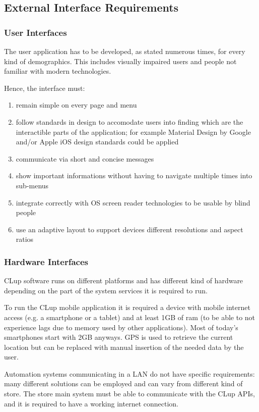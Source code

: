 \subsection{External Interface Requirements}
\subsubsection{User Interfaces}
The user application has to be developed, as stated numerous times, for every kind of demographics.
This includes visually impaired users and people not familiar with modern technologies.

Hence, the interface must:
\begin{enumerate}
    \item remain simple on every page and menu
    \item follow standards in design to accomodate users into finding which are the interactible parts of the application; for example Material Design by Google and/or Apple iOS design standards could be applied
    \item communicate via short and concise messages
    \item show important informations without having to navigate multiple times into sub-menus
    \item integrate correctly with OS screen reader technologies to be usable by blind people
    \item use an adaptive layout to support devices different resolutions and aspect ratios
\end{enumerate}

\subsubsection{Hardware Interfaces}
CLup software runs on different platforms and has different kind of hardware depending on the part of the system services it is required to run.

To run the CLup mobile application it is required a device with mobile internet access (e.g. a smartphone or a tablet) and at least 1GB of ram (to be able to not experience lags due to memory used by other applications). Most of today's smartphones start with 2GB anyways.
GPS is used to retrieve the current location but can be replaced with manual insertion of the needed data by the user.

Automation systems communicating in a LAN do not have specific requirements: many different solutions can be employed and can vary from different kind of store. The store main system must be able to communicate with the CLup APIs, and it is required to have a working internet connection.

